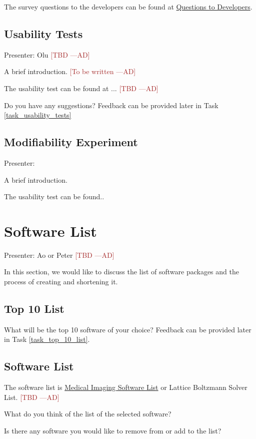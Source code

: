 \documentclass[12pt]{article}
\newcommand{\authornote}[3]{\textcolor{#1}{[#3 ---#2]}}
\newcommand{\authornote}[3]{}
\newcommand{\ad}[1]{\authornote{brown}{AD}{#1}} %
\begin{document}
The survey questions to the developers can be found at
\href{https://github.com/smiths/AIMSS/blob/master/StateOfPractice/Ao-Notes/Questions%20to%20Developers.pdf}{Questions
	to Developers}.

\subsection{Usability Tests}
\label{usability_tests}
Presenter: Olu \ad{TBD}

A brief introduction. \ad{To be written}

The usability test can be found at ... \ad{TBD}

Do you have any suggestions? Feedback can be provided later in Task
\ref{task_usability_tests}

\subsection{Modifiability Experiment}
\label{modifiability_experiment}
Presenter:

A brief introduction. 

The usability test can be found..

\section{Software List}
Presenter: Ao or Peter \ad{TBD}

In this section, we would like to discuss the list of software packages and the
process of creating and shortening it.

\subsection{Top 10 List}
\label{top_10_list}
What will be the top 10 software of your choice? Feedback can be provided later
in Task \ref{task_top_10_list}.

\subsection{Software List}
\label{software_list}
The software list is
\href{https://docs.google.com/spreadsheets/d/122wU0v3ZtvDcqy8C4zKJ89kU-8fXAbo3Mzn6vcVXOi0/edit?usp=sharing}{Medical
	Imaging Software List} or Lattice Boltzmann Solver List. \ad{TBD}

What do you think of the list of the selected software?

Is there any software you would like to remove from or add to the list?
\end{document}
